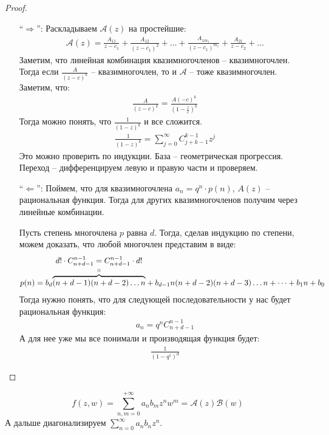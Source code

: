 \begin{proof} \quad 

    \begin{itemize}
        \item[``$\Longrightarrow$'':] Раскладываем $\mathscr A(z)$ на простейшие:
        \begin{gather*}
            \mathscr A (z) = \frac{A_{11}}{z - c_1} + \frac{A_{12}}{(z - c_1)^2} + \dots + \frac{A_{1m_1}}{(z - c_1)^{m_1}} + \frac{A_{21}}{z - c_2} + \dots    
        \end{gather*}
        Заметим, что линейная комбинация квазимногочленов -- квазимногочлен. Тогда если $\frac{A}{(z - c)^k}$ -- квазимногочлен, то и $\mathscr A$ -- тоже квазимногочлен. 
        Заметим, что: 
        \begin{gather*}
            \frac{A}{(z - c)^k} = \frac{A (-c)^k}{(1 - \frac{z}{c})^k}
        \end{gather*}
        Тогда можно понять, что $\frac{1}{(1 - z)^k}$ и все сложится. 
        \begin{gather*}
            \frac{1}{(1 - z)^k} = \sum\limits_{j=0}^{\infty} C_{j+k-1}^{k-1} z^j
        \end{gather*}
        Это можно проверить по индукции. База -- геометрическая прогрессия. Переход -- дифференцируем левую и правую части и проверяем. 
        \item[``$\Longleftarrow$'':] Поймем, что для квазимногочлена $a_n = q^n \cdot p(n)$, $A(z)$ -- рациональная функция. Тогда для других квазимногочленов получим через линейные комбинации. 
        
        Пусть степень многочлена $p$ равна $d$. Тогда, сделав индукцию по степени, можем доказать, что любой многочлен представим в виде: 
        \begin{gather*}
            p(n) = b_d \stackabove{\overbrace{(n+d-1)(n+d-2) \dots n}}{d! \cdot C_{n+d-1}^{n-1} = C_{n+d-1}^{n-1} \cdot d!} + b_{d-1}n(n+d-2)(n+d-3)\dots n + \dots + b_1n + b_0
        \end{gather*}
        Тогда нужно понять, что для следующей последовательности у нас будет рациональная функция:
        \begin{gather*}
            a_n = q^n C_{n+d-1}^{n-1}
        \end{gather*}
        А для нее уже мы все понимали и производящая функция будет: 
        \begin{gather*}
            \frac{1}{(1 - q^z)^d}
        \end{gather*}
    \end{itemize}
\end{proof}

\example 
\[
    f(z, w) = \sum\limits_{n, m = 0}^{+\infty} a_nb_mz^nw^m
    = \mathscr A(z) \mathscr B(w)
\]
А дальше диагонализируем $\sum\limits_{n=0}^\infty a_n b_n z^n$. 
\newpage

